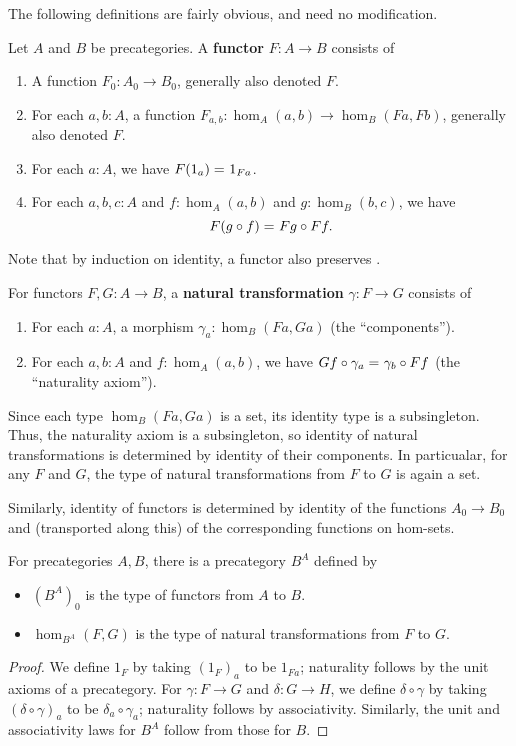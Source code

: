 The following definitions are fairly obvious, and need no modification.

\begin{defn}\label{ct:functor}
  Let $A$ and $B$ be precategories.
  A \textbf{functor} $F:A\to B$ consists of
  \begin{enumerate}
  \item A function $F_0:A_0\to B_0$, generally also denoted $F$.
  \item For each $a,b:A$, a function $F_{a,b}:\hom_A(a,b) \to \hom_B(Fa,Fb)$, generally also denoted $F$.
  \item For each $a:A$, we have $F(1_a) =_{} 1_{Fa}$.
  \item For each $a,b,c:A$ and $f:\hom_A(a,b)$ and $g:\hom_B(b,c)$, we have
    \[F(g\circ f) =_{} Fg\circ Ff.\]
  \end{enumerate}
\end{defn}

Note that by induction on identity, a functor also preserves \idtoiso.

\begin{defn}\label{ct:nattrans}
  For functors $F,G:A\to B$, a \textbf{natural transformation} $\gamma:F\to G$ consists of
  \begin{enumerate}
  \item For each $a:A$, a morphism $\gamma_a:\hom_B(Fa,Ga)$ (the ``components'').
  \item For each $a,b:A$ and $f:\hom_A(a,b)$, we have $Gf\circ \gamma_a =_{} \gamma_b\circ Ff$ (the ``naturality axiom'').
  \end{enumerate}
\end{defn}

Since each type $\hom_B(Fa,Ga)$ is a set, its identity type is a subsingleton.
Thus, the naturality axiom is a subsingleton, so identity of natural transformations is determined by identity of their components.
In particualar, for any $F$ and $G$, the type of natural transformations from $F$ to $G$ is again a set.

Similarly, identity of functors is determined by identity of the functions $A_0\to B_0$ and (transported along this) of the corresponding functions on hom-sets.

\begin{defn}\label{ct:functor-precat}
  For precategories $A,B$, there is a precategory $B^A$ defined by
  \begin{itemize}
  \item $(B^A)_0$ is the type of functors from $A$ to $B$.
  \item $\hom_{B^A}(F,G)$ is the type of natural transformations from $F$ to $G$.
  \end{itemize}
\end{defn}
\begin{proof}
  We define $1_F$ by taking $(1_F)_a$ to be $1_{Fa}$; naturality follows by the unit axioms of a precategory.
  For $\gamma:F\to G$ and $\delta:G\to H$, we define $\delta\circ \gamma$ by taking $(\delta\circ\gamma)_a$ to be $\delta_a\circ \gamma_a$; naturality follows by associativity.
  Similarly, the unit and associativity laws for $B^A$ follow from those for $B$.
\end{proof}


